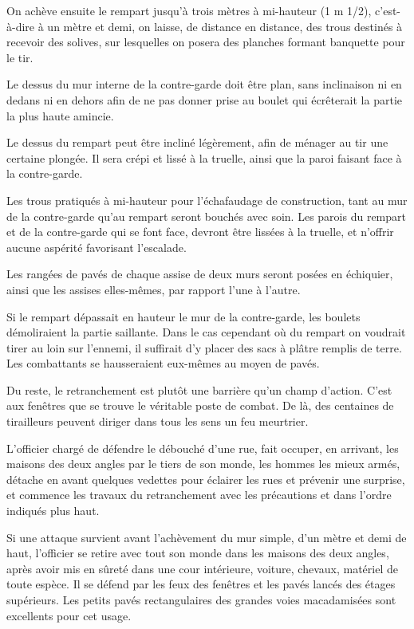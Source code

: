 \documentclass[french,twoside]{book} %
\begin{document}
On achève ensuite le rempart jusqu’à trois mètres à mi-hauteur (1 m 1/2), c’est-à-dire à un mètre et demi, on laisse, de distance en distance, des trous destinés à recevoir des solives, sur lesquelles on posera des planches formant banquette pour le tir.\par
Le dessus du mur interne de la contre-garde doit être plan, sans inclinaison ni en dedans ni en dehors afin de ne pas donner prise au boulet qui écrêterait la partie la plus haute amincie.\par
Le dessus du rempart peut être incliné légèrement, afin de ménager au tir une certaine plongée. Il sera crépi et lissé à la truelle, ainsi que la paroi faisant face à la contre-garde.\par
Les trous pratiqués à mi-hauteur pour l’échafaudage de construction, tant au mur de la contre-garde qu’au rempart seront bouchés avec soin. Les parois du rempart et de la contre-garde qui se font face, devront être lissées à la truelle, et n’offrir aucune aspérité favorisant l’escalade.\par
Les rangées de pavés de chaque assise de deux murs seront posées en échiquier, ainsi que les assises elles-mêmes, par rapport l’une à l’autre.\par
Si le rempart dépassait en hauteur le mur de la contre-garde, les boulets démoliraient la partie saillante. Dans le cas cependant où du rempart on voudrait tirer au loin sur l’ennemi, il suffirait d’y placer des sacs à plâtre remplis de terre. Les combattants se hausseraient eux-mêmes au moyen de pavés.\par
Du reste, le retranchement est plutôt une barrière qu’un champ d’action. C'est aux fenêtres que se trouve le véritable poste de combat. De là, des centaines de tirailleurs peuvent diriger dans tous les sens un feu meurtrier.\par
L'officier chargé de défendre le débouché d’une rue, fait occuper, en arrivant, les maisons des deux angles par le tiers de son monde, les hommes les mieux armés, détache en avant quelques vedettes pour éclairer les rues et prévenir une surprise, et commence les travaux du retranchement avec les précautions et dans l’ordre indiqués plus haut.\par
Si une attaque survient avant l’achèvement du mur simple, d’un mètre et demi de haut, l’officier se retire avec tout son monde dans les maisons des deux angles, après avoir mis en sûreté dans une cour intérieure, voiture, chevaux, matériel de toute espèce. Il se défend par les feux des fenêtres et les pavés lancés des étages supérieurs. Les petits pavés rectangulaires des grandes voies macadamisées sont excellents pour cet usage.\par
\end{document}

